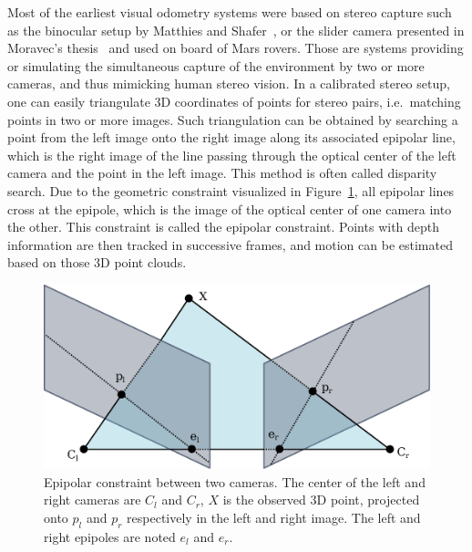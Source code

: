 Most of the earliest visual odometry systems were based on stereo capture
such as the binocular setup by Matthies and Shafer~\cite{matthies1987error},
or the slider camera presented in Moravec's thesis~\cite{moravec1980obstacle}
and used on board of Mars rovers.
Those are systems providing or simulating the simultaneous capture
of the environment by two or more cameras, and thus mimicking human stereo vision.
In a calibrated stereo setup, one can easily triangulate 3D coordinates
of points for stereo pairs, i.e.\ matching points in two or more images.
Such triangulation can be obtained by searching a point from the left image
onto the right image along its associated epipolar line,
which is the right image of the line passing through the optical center
of the left camera and the point in the left image.
This method is often called disparity search.
Due to the geometric constraint visualized in Figure~\ref{fig:epipolar},
all epipolar lines cross at the epipole, which is the image of the optical center
of one camera into the other.
This constraint is called the epipolar constraint.
Points with depth information are then tracked in successive frames,
and motion can be estimated based on those 3D point clouds.

\begin{figure}[h]
	\centering
	\includegraphics[width=\linewidth]{assets/img/epipolar.pdf}
	\caption{Epipolar constraint between two cameras.
	The center of the left and right cameras are $C_l$ and $C_r$,
	$X$ is the observed 3D point, projected onto $p_l$ and $p_r$
	respectively in the left and right image.
	The left and right epipoles are noted $e_l$ and $e_r$.}%
	\label{fig:epipolar}
\end{figure}

